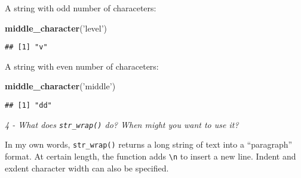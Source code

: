 \documentclass[]{article}
\newenvironment{Shaded}{\begin{snugshade}}{\end{snugshade}}
\newcommand{\KeywordTok}[1]{\textcolor[rgb]{0.13,0.29,0.53}{\textbf{#1}}}
\newcommand{\DataTypeTok}[1]{\textcolor[rgb]{0.13,0.29,0.53}{#1}}
\newcommand{\DecValTok}[1]{\textcolor[rgb]{0.00,0.00,0.81}{#1}}
\newcommand{\StringTok}[1]{\textcolor[rgb]{0.31,0.60,0.02}{#1}}
\newcommand{\ControlFlowTok}[1]{\textcolor[rgb]{0.13,0.29,0.53}{\textbf{#1}}}
\newcommand{\OperatorTok}[1]{\textcolor[rgb]{0.81,0.36,0.00}{\textbf{#1}}}
\newcommand{\NormalTok}[1]{#1}
\theoremstyle{definition}
\theoremstyle{definition}
\theoremstyle{definition}
\theoremstyle{remark}
\begin{document}
\begin{Shaded}
\end{Shaded}

A string with odd number of characeters:

\begin{Shaded}
\begin{Highlighting}[]
\KeywordTok{middle_character}\NormalTok{(}\StringTok{'level'}\NormalTok{)}
\end{Highlighting}
\end{Shaded}

\begin{verbatim}
## [1] "v"
\end{verbatim}

A string with even number of characeters:

\begin{Shaded}
\begin{Highlighting}[]
\KeywordTok{middle_character}\NormalTok{(}\StringTok{'middle'}\NormalTok{)}
\end{Highlighting}
\end{Shaded}

\begin{verbatim}
## [1] "dd"
\end{verbatim}

\emph{4 - What does \texttt{str\_wrap()} do? When might you want to use
it?}

In my own words, \texttt{str\_wrap()} returns a long string of text into
a ``paragraph'' format. At certain length, the function adds
\texttt{\textbackslash{}n} to insert a new line. Indent and exdent
character width can also be specified.
\end{document}
